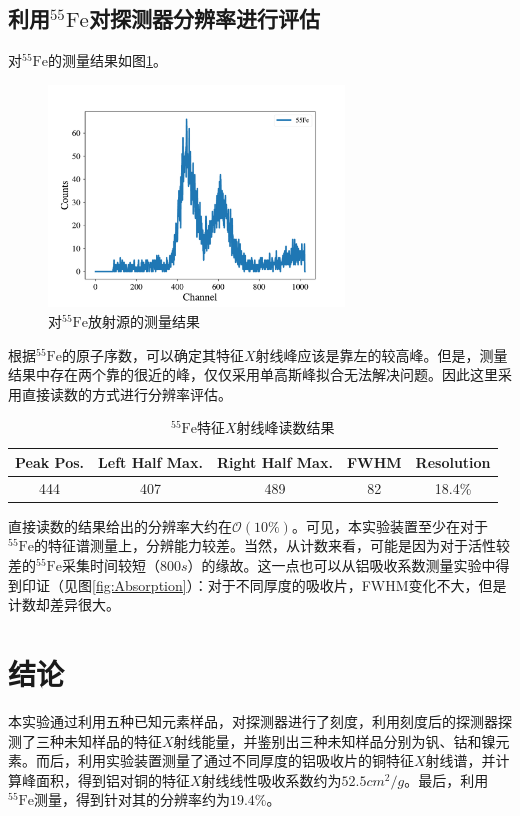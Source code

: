 \documentclass{article}
\begin{document}
    \subsection{利用$^{55}\text{Fe}$对探测器分辨率进行评估}
    对$^{55}\text{Fe}$的测量结果如图\ref{fig:55Fe}。
    \begin{figure}
        \centering
        \includegraphics[width=0.7\textwidth]{../plot/55Fe.pdf}
        \caption{对$^{55}\text{Fe}$放射源的测量结果\label{fig:55Fe}}
    \end{figure}
    根据$^{55}\text{Fe}$的原子序数，可以确定其特征$X$射线峰应该是靠左的较高峰。但是，测量结果中存在两个靠的很近的峰，仅仅采用单高斯峰拟合无法解决问题。因此这里采用直接读数的方式进行分辨率评估。
    \begin{table}[htbp]
        \centering
        \caption{$^{55}\text{Fe}$特征$X$射线峰读数结果\label{tab:55Fe}}
        \begin{tabular}{ccccc}
            \toprule
            Peak Pos. &  Left Half Max. & Right Half Max.   &     FWHM        &       Resolution  \\
            \midrule
            444  &      407 &     489 &     82 &    18.4\% \\
            \bottomrule
            \end{tabular}
    \end{table} 
    直接读数的结果给出的分辨率大约在$\mathcal{O}(10\%)$。可见，本实验装置至少在对于$^{55}\text{Fe}$的特征谱测量上，分辨能力较差。当然，从计数来看，可能是因为对于活性较差的$^{55}\text{Fe}$采集时间较短（$800\si{s}$）的缘故。这一点也可以从铝吸收系数测量实验中得到印证（见图\ref{fig:Absorption}）：对于不同厚度的吸收片，FWHM变化不大，但是计数却差异很大。
    \section{结论}
    本实验通过利用五种已知元素样品，对探测器进行了刻度，利用刻度后的探测器探测了三种未知样品的特征$X$射线能量，并鉴别出三种未知样品分别为钒、钴和镍元素。而后，利用实验装置测量了通过不同厚度的铝吸收片的铜特征$X$射线谱，并计算峰面积，得到铝对铜的特征$X$射线线性吸收系数约为$52.5\si{cm^2\per g}$。最后，利用$^{55}\text{Fe}$测量，得到针对其的分辨率约为$19.4\%$。
\end{document}
